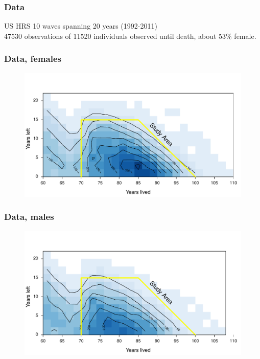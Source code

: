 \documentclass{beamer}
\begin{document}

\begin{frame}
\frametitle{Data}
\begin{block}{US HRS}
10 waves spanning 20 years (1992-2011)\\
47530 observations of 11520 individuals observed until death, about 53\% female.
\end{block}
\end{frame}


\begin{frame}
\frametitle{Data, females}
\begin{figure}
\includegraphics[width=\linewidth]{Figures/CaseCountFemales}
\end{figure}
\end{frame}


\begin{frame}
\frametitle{Data, males}
\begin{figure}
\includegraphics[width=\linewidth]{Figures/CaseCountMales}
\end{figure}
\end{frame}
\end{document}
